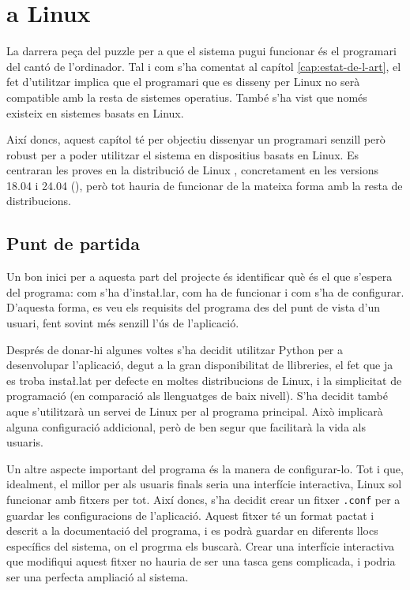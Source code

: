 \chapter{ a Linux}

La darrera peça del puzzle per a que el sistema pugui funcionar és el
programari del cantó de l'ordinador. Tal i com s'ha comentat al capítol
\ref{cap:estat-de-l-art}, el fet d'utilitzar  implica que el
programari que es disseny per Linux no serà compatible amb la resta de
sistemes operatius. També s'ha vist que  només existeix en sistemes
basats en Linux.

Així doncs, aquest capítol té per objectiu dissenyar un programari senzill però
robust per a poder utilitzar el sistema en dispositius basats en Linux. Es
centraran les proves en la distribució de Linux , concretament en
les versions 18.04 i 24.04  (), però tot hauria
de funcionar de la mateixa forma amb la resta de distribucions.

\section{Punt de partida}

Un bon inici per a aquesta part del projecte és identificar què és el que
s'espera del programa: com s'ha d'insta\l.lar, com ha de funcionar i com
s'ha de configurar. D'aquesta forma, es veu els requisits del programa des del
punt de vista d'un usuari, fent sovint més senzill l'ús de l'aplicació.

Després de donar-hi algunes voltes s'ha decidit utilitzar Python per a
desenvolupar l'aplicació, degut a la gran disponibilitat de llibreries, el fet
que ja es troba insta\l.lat per defecte en moltes distribucions de Linux, i
la simplicitat de programació (en comparació als llenguatges de baix nivell).
S'ha decidit també aque s'utilitzarà un servei de Linux per al programa principal.
Això implicarà alguna configuració addicional, però de ben segur que facilitarà
la vida als usuaris.

Un altre aspecte important del programa és la manera de configurar-lo. Tot i que,
idealment, el millor per als usuaris finals seria una interfície interactiva,
Linux sol funcionar amb fitxers per tot. Així doncs, s'ha decidit crear un fitxer
\verb|.conf| per a guardar les configuracions de l'aplicació. Aquest fitxer té
un format pactat i descrit a la documentació del programa, i es podrà guardar en
diferents llocs específics del sistema, on el progrma els buscarà. Crear una
interfície interactiva que modifiqui aquest fitxer no hauria de ser una tasca
gens complicada, i podria ser una perfecta ampliació al sistema.


